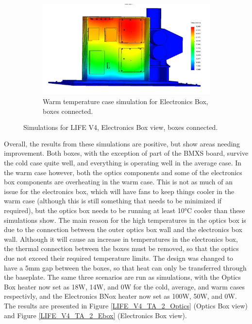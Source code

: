 \begin{figure}
    \begin{subfigure}[h]{0.65\textwidth}
        \centering
        \includegraphics[width=\textwidth]{chap3_images/LIFE_V4_images/TA_Full_Model_Iter_3_ebox.JPG}
        \caption{Warm temperature case simulation for Electronics Box, boxes connected.}
        \label{fig:LIFE_V4_TA_Ebox_1c}
    \end{subfigure}
    \caption{Simulations for LIFE V4, Electronics Box view, boxes connected.}
    \label{LIFE_V4_TA_1_Ebox}
\end{figure}

Overall, the results from these simulations are positive, but show areas needing improvement. Both boxes, with the exception of part of the BMXS board, survive the cold case quite well, and everything is operating well in the average case. In the warm case however, both the optics components and some of the electronics box components are overheating in the warm case. This is not as much of an issue for the electronics box, which will have fans to keep things cooler in the warm case (although this is still something that needs to be minimized if required), but the optics box needs to be running at least 10°C cooler than these simulations show. The main reason for the high temperatures in the optics box is due to the connection between the outer optics box wall and the electronics box wall. Although it will cause an increase in temperatures in the electronics box, the thermal connection between the boxes must be removed, so that the optics due not exceed their required temperature limits. The design was changed to have a 5mm gap between the boxes, so that heat can only be transferred through the baseplate. The same three scenarios are run as simulations, with the Optics Box heater now set as 18W, 14W, and 0W for the cold, average, and warm cases respectivly, and the Electronics BNox heater now set as 100W, 50W, and 0W. The results are presented in Figure \ref{LIFE_V4_TA_2_Optics} (Optics Box view) and Figure \ref{LIFE_V4_TA_2_Ebox} (Electronics Box view).

